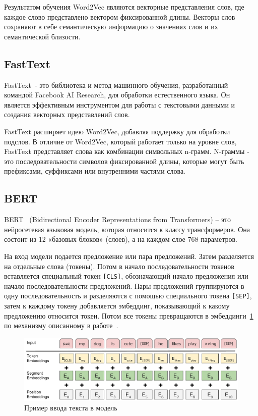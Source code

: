 \documentclass[PI, VKR]{HSEUniversity}
\begin{document}
Результатом обучения Word2Vec являются векторные представления слов, где каждое слово представлено вектором фиксированной длины. Векторы слов сохраняют в себе семантическую информацию о значениях слов и их семантической близости.
\subsection{FastText}
\label{sec:org734ba7f}
FastText~\autocite{joulin_bag_2016}- это библиотека и метод машинного обучения, разработанный командой Facebook AI Research, для обработки естественного языка. Он является эффективным инструментом для работы с текстовыми данными и создания векторных представлений слов.

FastText расширяет идею Word2Vec, добавляя поддержку для обработки подслов. В отличие от Word2Vec, который работает только на уровне слов, FastText представляет слова как комбинации символьных n-грамм. N-граммы - это последовательности символов фиксированной длины, которые могут быть префиксами, суффиксами или внутренними частями слова.
\subsection{BERT}
\label{sec:orgce3e872}
BERT~\autocite{devlin_bert_2019} (Bidirectional Encoder Representations from Transformers) -- это нейросетевая языковая модель, которая относится к классу трансформеров. Она состоит из 12 «базовых блоков» (слоев), а на каждом слое 768 параметров.

На вход модели подается предложение или пара предложений. Затем разделяется на отдельные слова (токены). Потом в начало последовательности токенов вставляется специальный токен \texttt{[CLS]}, обозначающий начало предложения или начало последовательности предложений. Пары предложений группируются в одну последовательность и разделяются с помощью специального токена \texttt{[SEP]}, затем к каждому токену добавляется эмбеддинг, показывающий к какому предложению относится токен. Потом все токены превращаются в эмбеддинги~\ref{fig:inputemebeddings} по механизму описанному в работе~\autocite{vaswani_attention_2017}.

\begin{figure}[h]
\centering
\includegraphics[width=.9\linewidth]{img/Input_Emebeddings.pdf}
\caption{\label{fig:inputemebeddings}Пример ввода текста в модель}
\end{figure}
\end{document}
